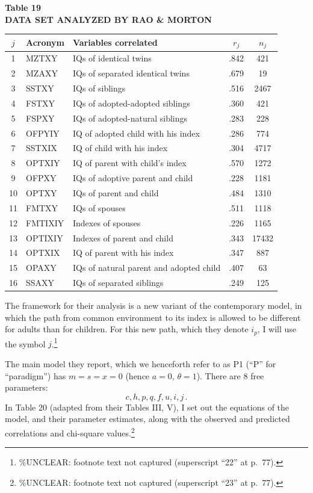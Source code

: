 ﻿\documentclass[12pt]{article}
\begin{document}
\begin{center}
\textbf{Table 19}\\
\textbf{DATA SET ANALYZED BY RAO \& MORTON}
\end{center}
\begin{center}
\small
\begin{tabular}{c l l c c}
\hline
$j$ & Acronym & Variables correlated & $r_j$ & $n_j$ \\
\hline
1 & MZTXY & IQs of identical twins & .842 & 421 \\
2 & MZAXY & IQs of separated identical twins & .679 & 19 \\
3 & SSTXY & IQs of siblings & .516 & 2467 \\
4 & FSTXY & IQs of adopted-adopted siblings & .360 & 421 \\
5 & FSPXY & IQs of adopted-natural siblings & .283 & 228 \\
6 & OFPYIY & IQ of adopted child with his index & .286 & 774 \\
7 & SSTXIX & IQ of child with his index & .304 & 4717 \\
8 & OPTXIY & IQ of parent with child's index & .570 & 1272 \\
9 & OFPXY & IQs of adoptive parent and child & .228 & 1181 \\
10 & OPTXY & IQs of parent and child & .484 & 1310 \\
11 & FMTXY & IQs of spouses & .511 & 1118 \\
12 & FMTIXIY & Indexes of spouses & .226 & 1165 \\
13 & OPTIXIY & Indexes of parent and child & .343 & 17432 \\
14 & OPTXIX & IQ of parent with his index & .347 & 887 \\
15 & OPAXY & IQs of natural parent and adopted child & .407 & 63 \\
16 & SSAXY & IQs of separated siblings & .249 & 125 \\
\hline
\end{tabular}
\end{center}

The framework for their analysis is a new variant of the contemporary model, in which the path from common environment to its index is allowed to be different for adults than for children. For this new path, which they denote $i_p$, I will use the symbol $j$.\footnote{\%UNCLEAR: footnote text not captured (superscript ``22'' at p.\ 77).}

The main model they report, which we henceforth refer to as P1 (``P'' for ``paradigm'') has $m=s=x=0$ (hence $a=0$, $\theta=1$). There are 8 free parameters:
\begin{equation*}
c, h, p, q, f, u, i, j \, .
\end{equation*}
In Table 20 (adapted from their Tables III, V), I set out the equations of the model, and their parameter estimates, along with the observed and predicted correlations and chi-square values.\footnote{\%UNCLEAR: footnote text not captured (superscript ``23'' at p.\ 77).}
\end{document}
